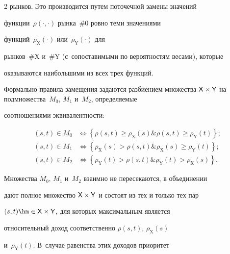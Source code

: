 \begin{multicols}{2}
рынков. Это производится путем поточечной замены значений 


функции~$\rho(\cdot,\cdot)$ рынка~\#0 ровно теми значениями 


функций~$\rho_{\mathrm{X}}(\cdot)$ или~$\rho_{\mathrm{Y}}(\cdot)$ для 


рынков~\#X и~\#Y (с~сопоставимыми по вероятностям весами), которые 


оказываются наибольшими из всех трех функций. 


  


  Формально правила замещения задаются разбиением множества ${\sf 


X}\times {\sf Y}$ на подмножества~$M_0$, $M_1$ и~$M_2$, определяемые 


соотношениями эквивалентности: 


  \begin{align}


  (s,t)\in M_0 &\Leftrightarrow \left\{ \rho(s,t)\geq 


\rho_{\mathrm{X}}(s)\&\rho(s,t)\geq \rho_{\mathrm{Y}}(t)\right\};\!\!


  \label{e3-ag}\\


  (s,t)\in M_1 &\Leftrightarrow \left\{ \rho_{\mathrm{X}}(s)> 


\rho(s,t)\&\rho_{\mathrm{X}}(s)\geq \rho_{\mathrm{Y}}(t)\right\};\!\!


  \label{e4-ag}\\


  (s,t)\in M_2 &\Leftrightarrow \left\{ \rho_{\mathrm{Y}}(t)> 


\rho(s,t)\&\rho_{\mathrm{Y}}(t)> \rho_{\mathrm{X}}(s)\right\}.\!\!


  \label{e5-ag}


  \end{align}


  


  Множества $M_0$, $M_1$ и~$M_2$ взаимно не пересекаются, в объединении 


дают полное множество ${\sf X}\times{\sf Y}$ и состоят из тех и только тех пар 


$(s,t) \hm\in {\sf X}\times{\sf Y}$, для которых максимальным является 


относительный доход соответственно $\rho(s, t)$, $\rho_{\mathrm{X}}(s)$ 


и~$\rho_{\mathrm{Y}}(t)$. В~случае равенства этих доходов приоритет 



\end{multicols}
